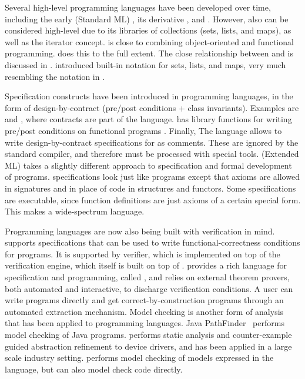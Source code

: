 Several high-level programming languages have been developed over
time, including the early \sml{} (Standard ML) \cite{standard-ml-97},
its derivative \ocaml{} \cite{ocaml}, and \haskell{}
\cite{haskell}. However, also \java{} can be considered high-level due
to its libraries of collections (sets, lists, and maps), as well as
the iterator concept. \python{} \cite{python} is close to combining
object-oriented and functional programming. \scala{} \cite{scala} does
this to the full extent. The close relationship between \scala{} and
\vdm{} is discussed in \cite{havelund-scala-vdm-12}.  \fortress{}
\cite{fortress} introduced built-in notation for sets, lists, and
maps, very much resembling the notation in \vdm{}.

Specification constructs have been introduced in programming
languages, in the form of design-by-contract (pre/post conditions +
class invariants). Examples are \eiffel{} \cite{eiffel} and
\specsharp{} \cite{specsharp}, where contracts are part of the
language. \scala{} has library functions for writing pre/post
conditions on functional programs \cite{odersky-rv10}. Finally, The
\jml{} language \cite{jml} allows to write design-by-contract
specifications for \java{} as comments. These are ignored by the
standard \java{} compiler, and therefore must be processed with
special tools. \eml{} (Extended ML) \cite{sannella-eml-97} takes a
slightly different approach to specification and formal development of
\sml{} programs.  \eml{} specifications look just like \sml{} programs
except that axioms are allowed in signatures and in place of code in
structures and functors. Some \eml{} specifications are executable,
since \sml{} function definitions are just axioms of a certain special
form. This makes \eml{} a wide-spectrum language.

Programming languages are now also being built with verification in
mind.  \dafny{} \cite{leino-lpar-2010} supports specifications that
can be used to write functional-correctness conditions for programs.
It is supported by verifier, which is implemented on top of the
\boogie{} verification engine, which itself is built on top of
\zthree.  \whythree{} \cite{filliatre-why3-2011} provides a rich
language for specification and programming, called \whyml{}, and
relies on external theorem provers, both automated and interactive, to
discharge verification conditions. A user can write \whyml{} programs
directly and get correct-by-construction \ocaml{} programs through an
automated extraction mechanism. Model checking is another form of
analysis that has been applied to programming languages.  Java
PathFinder~\cite{havelund-jpf-00,havelund-visser02} performs model
checking of Java programs. \slam{} \cite{ball2010slam2} performs
static analysis and counter-example guided abstraction refinement to
device drivers, and has been applied in a large scale industry
setting.  \spin{} \cite{holzmann-spin-2004} performs model checking of
models expressed in the \promela{} language, but can also model check
\clang{} code directly.

